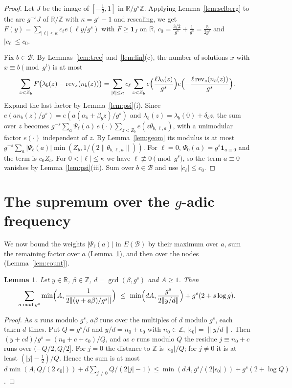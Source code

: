 \documentclass[11pt]{amsart}
\newtheorem{lemma}[theorem]{Lemma}
\theoremstyle{definition}
\numberwithin{equation}{section}
\newcommand{\cB}{\mathcal{B}}
\newcommand{\rev}{\operatorname{rev}}
\newcommand{\Z}{\mathbb{Z}}
\newcommand{\R}{\mathbb{R}}
\begin{document}
\begin{proof}
Let $J$ be the image of $[-\frac12,1]$ in $\R/g^s\Z$. Applying
Lemma~\ref{lem:selberg} to the arc $g^{-s}J$ of $\R/\Z$ with $\kappa=g^s-1$ and
rescaling, we get $F(y)=\sum_{|\ell|\le\kappa}c_\ell e(\ell y/g^s)$ with
$F\ge\mathbf1_J$ on $\R$, $c_0=\frac{3/2}{g^s}+\frac1{g^s}=\frac5{2g^s}$ and
$|c_\ell|\le c_0$.

Fix $b\in\cB$. By Lemmas~\ref{lem:tree} and~\ref{lem:lin}(c), the number of
solutions $x$ with $x\equiv b\pmod{g^t}$ is at most
\[
\sum_{z<Z_b}F\bigl(\lambda_b(z)-\rev_s(n_b(z))\bigr)
=\sum_{|\ell|\le\kappa}c_\ell\sum_{z<Z_b}e\Bigl(\frac{\ell\lambda_b(z)}{g^s}\Bigr)e\Bigl(-\frac{\ell\rev_s(n_b(z))}{g^s}\Bigr).
\]
Expand the last factor by Lemma~\ref{lem:psi}(i). Since
$e(an_b(z)/g^s)=e(a(\alpha_b+\beta_bz)/g^s)$ and
$\lambda_b(z)=\lambda_b(0)+\delta_bz$, the sum over $z$ becomes
$g^{-s}\sum_a\Psi_\ell(a)\,e(\cdot)\sum_{z<Z_b}e(z\theta_{b,\ell,a})$, with a
unimodular factor $e(\cdot)$ independent of $z$. By Lemma~\ref{lem:geom}
its modulus is at most
$g^{-s}\sum_a|\Psi_\ell(a)|\min(Z_b,1/(2\|\theta_{b,\ell,a}\|))$. For
$\ell=0$, $\Psi_0(a)=g^s\mathbf1_{a\equiv0}$ and the term is $c_0Z_b$. For
$0<|\ell|\le\kappa$ we have $\ell\not\equiv0\pmod{g^s}$, so the term $a\equiv0$
vanishes by Lemma~\ref{lem:psi}(iii). Sum over $b\in\cB$ and use
$|c_\ell|\le c_0$.
\end{proof}

\section{The supremum over the \texorpdfstring{$g$}{g}-adic frequency}\label{sec:count}

We now bound the weights $|\Psi_\ell(a)|$ in $E(\cB)$ by their maximum
over $a$, sum the remaining factor over $a$ (Lemma~\ref{lem:asum}), and
then over the nodes (Lemma~\ref{lem:count}).

\begin{lemma}\label{lem:asum}
Let $y\in\R$, $\beta\in\Z$, $d=\gcd(\beta,g^s)$ and $A\ge1$. Then
\[
\sum_{a\bmod g^s}\min\Bigl(A,\frac1{2\|(y+a\beta)/g^s\|}\Bigr)\ \le\
\min\Bigl(dA,\frac{g^s}{2\|y/d\|}\Bigr)+g^s(2+s\log g).
\]
\end{lemma}

\begin{proof}
As $a$ runs modulo $g^s$, $a\beta$ runs over the multiples of $d$ modulo
$g^s$, each taken $d$ times. Put $Q=g^s/d$ and $y/d=n_0+\epsilon_0$ with
$n_0\in\Z$, $|\epsilon_0|=\|y/d\|$. Then $(y+cd)/g^s=(n_0+c+\epsilon_0)/Q$, and as $c$ runs
modulo $Q$ the residue $j\equiv n_0+c$ runs over $(-Q/2,Q/2]$. For $j=0$ the
distance to $\Z$ is $|\epsilon_0|/Q$; for $j\ne0$ it is at least $(|j|-\frac12)/Q$.
Hence the sum is at most
$d\min(A,Q/(2|\epsilon_0|))+d\sum_{j\ne0}Q/(2|j|-1)\le\min(dA,g^s/(2|\epsilon_0|))+g^s(2+\log Q)$.
\end{proof}
\end{document}
